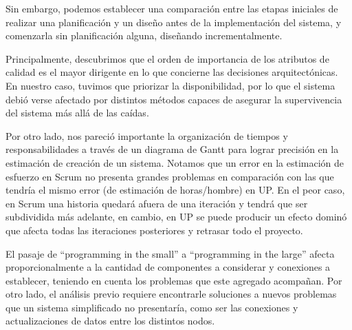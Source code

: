 \documentclass[a4paper, 10pt, twoside]{article}
\begin{document}
Sin embargo, podemos establecer una comparación entre las etapas iniciales de realizar una planificación y un diseño antes de la implementación del sistema, y comenzarla sin planificación alguna, diseñando incrementalmente.

Principalmente, descubrimos que el orden de importancia de los atributos de calidad es el mayor dirigente en lo que concierne las decisiones arquitectónicas. En nuestro caso, tuvimos que priorizar la disponibilidad, por lo que el sistema debió verse afectado por distintos métodos capaces de asegurar la supervivencia del sistema más allá de las caídas.

Por otro lado, nos pareció importante la organización de tiempos y responsabilidades a través de un diagrama de Gantt para lograr precisión en la estimación de creación de un sistema. Notamos que un error en la estimación de esfuerzo en Scrum no presenta grandes problemas en comparación con las que tendría el mismo error (de estimación de horas/hombre) en UP. En el peor caso, en Scrum una historia quedará afuera de una iteración y tendrá que ser subdividida más adelante, en cambio, en UP se puede producir un efecto dominó que afecta todas las iteraciones posteriores y retrasar todo el proyecto.

El pasaje de ``programming in the small'' a ``programming in the large'' afecta proporcionalmente a la cantidad de componentes a considerar y conexiones a establecer, teniendo en cuenta los problemas que este agregado acompañan. Por otro lado, el análisis previo requiere encontrarle soluciones a nuevos problemas que un sistema simplificado no presentaría, como ser las conexiones y actualizaciones de datos entre los distintos nodos.
\end{document}
